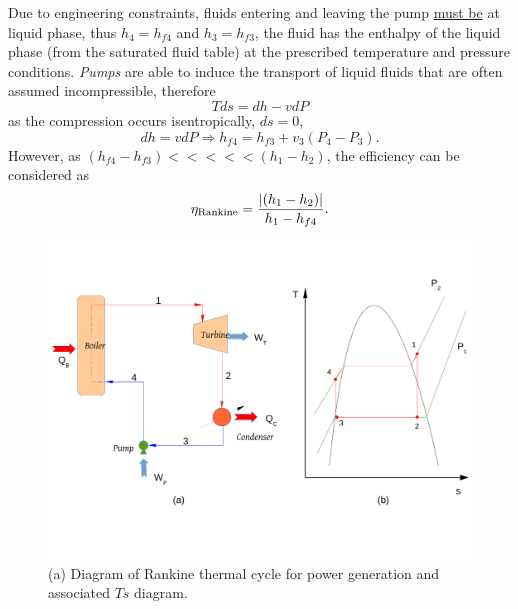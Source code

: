      Due to engineering constraints, fluids entering and leaving the pump \underline{must be} at liquid phase, thus $h_{4}=h_{f4}$ and $h_{3}=h_{f3}$, \ie the fluid has the enthalpy of the liquid phase (from the saturated fluid table) at the prescribed temperature and pressure conditions. {\it Pumps} are able to induce the transport of liquid fluids that are often assumed incompressible, therefore
          \begin{displaymath}
                Tds = dh - v dP
          \end{displaymath}
as the compression occurs isentropically, \ie $ds=0$,
          \begin{displaymath}
                dh = v dP \Rightarrow h_{f4} = h_{f3} + v_{3}\left(P_{4}-P_{3}\right).
          \end{displaymath}
However, as $\left(h_{f4}-h_{f3}\right) <<<<< \left(h_{1}-h_{2}\right)$, the efficiency can be considered as
           \begin{displaymath}
               \eta_{\text{Rankine}} = \displaystyle\frac{\left|\left(h_{1}-h_{2}\right)\right|}{h_{1}-h_{f4}}.
           \end{displaymath}     
%
   \begin{figure}[h]
      \begin{center}
         \includegraphics[width=\columnwidth,clip]{./Figs/Mod3PowerSystemDiagram}
      \end{center}
      \caption{ (a) Diagram of Rankine thermal cycle for power generation and associated $Ts$ diagram.}\label{Mod03Fig04}
   \end{figure}


